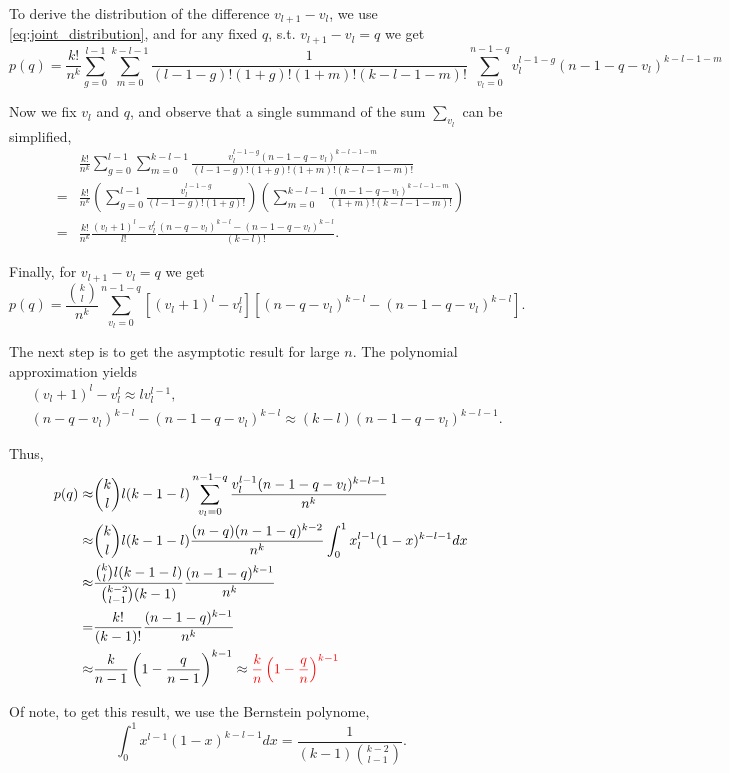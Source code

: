\documentclass{llncs}
\begin{document}
To derive the distribution of the difference $v_{l+1}-v_{l}$, we use \eqref{eq:joint_distribution}, and for any fixed $q$, s.t. $v_{l+1}-v_{l} = q$ we get
\[
p(q) = \frac{k!}{n^k}\sum^{l-1}_{g=0}\sum^{k-l-1}_{m=0}
\frac{1}{(l-1-g)!(1+g)!(1+m)!(k-l-1-m)!}\sum^{n-1-q}_{v_l = 0} v^{l-1-g}_l (n-1 - q - v_{l})^{k-l-1-m}
\]

Now we fix $v_l$ and $q$, and observe that
a single summand of the sum $\sum_{v_l}$ can be simplified,
\begin{align*}
    &\frac{k!}{n^k}\sum^{l-1}_{g=0}\sum^{k-l-1}_{m=0}
\frac{ v^{l-1-g}_l (n-1 - q - v_{l})^{k-l-1-m}}{(l-1-g)!(1+g)!(1+m)!(k-l-1-m)!}\\
= & 
\frac{k!}{n^k} 
\left(
\sum^{l-1}_{g=0} \frac{v^{l-1-g}_l}{(l-1-g)!(1+g)!} 
\right) 
\left(
\sum^{k-l-1}_{m=0} \frac{(n-1 - q - v_{l})^{k-l-1-m}}{(1+m)!(k-l-1-m)!}
\right) \\
= & \frac{k!}{n^k} \frac{(v_l + 1)^{l} - v^l_l}{l!} \frac{(n-q-v_l)^{k-l} - (n-1-q-v_l)^{k-l}}{(k-l)!}.
\end{align*}

Finally, for $v_{l+1}-v_{l} = q$ we get 
\[
p(q) = \frac{\binom{k}{l}}{n^k}\sum^{n-1-q}_{v_l = 0} \left[(v_l + 1)^{l} - v^l_l \right] \left[ (n-q-v_l)^{k-l} - (n-1-q-v_l)^{k-l}\right].
\]

The next step is to get the asymptotic result for large $n$. The polynomial approximation yields
\begin{align*}
    &(v_l + 1)^{l} - v^l_l \approx lv^{l-1}_l,\\
    & (n-q-v_l)^{k-l} - (n-1-q-v_l)^{k-l} \approx (k-l)(n-1-q-v_l)^{k-l-1}.
\end{align*}

Thus,
\begin{align*}
    p(q) \approx & \binom{k}{l} l (k-1-l)
    \sum^{n-1-q}_{v_l = 0} \frac{v^{l-1}_l (n-1-q-v_l)^{k-l-1}}{n^k}\\
    \approx & \binom{k}{l} l (k-1-l) \frac{(n-q) (n - 1-q)^{k-2}}{n^k}\int^{1}_{0} x^{l-1}_l(1-x)^{k-l-1}dx\\
    \approx & \frac{\binom{k}{l} l (k-1-l)}{\binom{k-2}{l-1} (k-1)} \frac{(n-1-q)^{k-1}}{n^k}\\
    = & \frac{k!}{(k-1)!}\frac{(n-1-q)^{k-1}}{n^k}\\
    \approx & \frac{k}{n-1}\left(1 - \frac{q}{n-1} \right)^{k-1} \approx \textcolor{red}{\frac{k}{n}\left(1 - \frac{q}{n} \right)^{k-1}}
\end{align*}

Of note, to get this result, we use the Bernstein polynome,
\[
\int^{1}_{0}x^{l-1}(1-x)^{k-l-1}dx = \frac{1}{(k-1)\binom{k-2}{l-1}}.
\]
\end{document}
